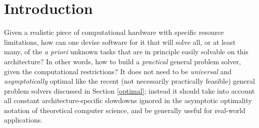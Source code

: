 \documentclass{article}
\begin{document}

\newpage
\tableofcontents

\newpage
\section{Introduction}
\label{intro}

Given a realistic piece of computational hardware with specific resource limitations, 
how can one devise software for it that will solve all, or at least many,
of the {\em a priori} unknown tasks that are in principle easily solvable on this architecture?
In other words, how to build a {\em practical} general problem solver, given the computational restrictions?
It does not need to be {\em universal} and  {\em asymptotically} optimal 
\cite{Levin:73,Hutter:01fast+,Schmidhuber:04oops,Schmidhuber:09gm}  
like the recent (not necessarily practically feasible) general problem solvers discussed
in Section \ref{optimal};  instead it should take into account all
constant architecture-specific slowdowns  ignored in the asymptotic 
optimality notation of theoretical computer science,
and be generally useful for real-world applications.
\end{document}
